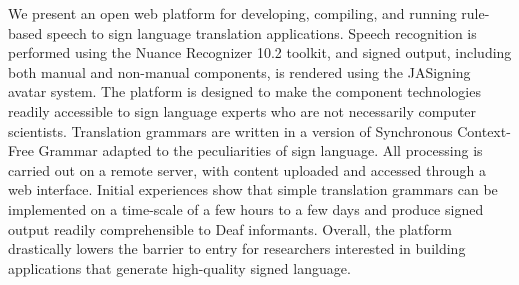 We present an open web platform for developing, compiling, and running rule-based speech to sign language translation applications. Speech recognition is performed using the Nuance Recognizer 10.2 toolkit, and signed output, including both manual and non-manual components, is rendered using the JASigning avatar system. The platform is designed to make the component technologies readily accessible to sign language experts who are not necessarily computer scientists. Translation grammars are written in a version of Synchronous Context-Free Grammar adapted to the peculiarities of sign language. All processing is carried out on a remote server, with content uploaded and accessed through a web interface. Initial experiences show that simple translation grammars can be implemented on a time-scale of a few hours to a few days and produce signed output readily comprehensible to Deaf informants. Overall, the platform drastically lowers the barrier to entry for researchers interested in building applications that generate high-quality signed language.
